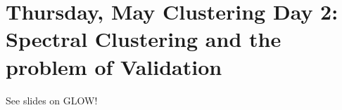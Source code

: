 \section{Thursday, May  Clustering Day 2: Spectral Clustering and the problem of Validation}

See slides on GLOW!










